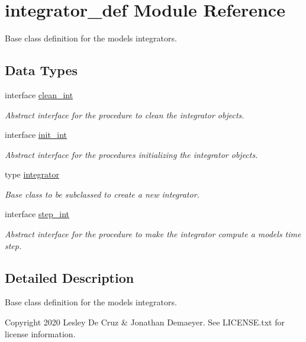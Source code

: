 \hypertarget{namespaceintegrator__def}{}\section{integrator\+\_\+def Module Reference}
\label{namespaceintegrator__def}


Base class definition for the model\textquotesingle{}s integrators.  


\subsection*{Data Types}
\begin{DoxyCompactItemize}
\item 
interface \hyperlink{interfaceintegrator__def_1_1clean__int}{clean\+\_\+int}
\begin{DoxyCompactList}\small\item\em Abstract interface for the procedure to clean the integrator objects. \end{DoxyCompactList}\item 
interface \hyperlink{interfaceintegrator__def_1_1init__int}{init\+\_\+int}
\begin{DoxyCompactList}\small\item\em Abstract interface for the procedures initializing the integrator objects. \end{DoxyCompactList}\item 
type \hyperlink{structintegrator__def_1_1integrator}{integrator}
\begin{DoxyCompactList}\small\item\em Base class to be subclassed to create a new integrator. \end{DoxyCompactList}\item 
interface \hyperlink{interfaceintegrator__def_1_1step__int}{step\+\_\+int}
\begin{DoxyCompactList}\small\item\em Abstract interface for the procedure to make the integrator compute a model\textquotesingle{}s time step. \end{DoxyCompactList}\end{DoxyCompactItemize}


\subsection{Detailed Description}
Base class definition for the model\textquotesingle{}s integrators. 

\begin{DoxyCopyright}{Copyright}
2020 Lesley De Cruz \& Jonathan Demaeyer. See L\+I\+C\+E\+N\+S\+E.\+txt for license information. 
\end{DoxyCopyright}
